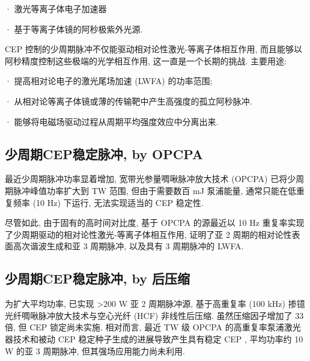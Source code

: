 \documentclass[14pt,a4paper,oneside]{article}
\numberwithin{equation}{subsection}             %
\numberwithin{figure}{subsection}               %
\begin{document}
· 激光等离子体电子加速器\cite{malkaLaserPlasmaAccelerators2012}

· 基于等离子体镜的阿秒极紫外光源\cite{thauryHighorderHarmonicAttosecond2010}. 

CEP 控制的少周期脉冲不仅能驱动相对论性激光-等离子体相互作用, 而且能够以阿秒精度控制这些极端的光学相互作用, 这一直是一个长期的挑战. 主要用途:

· 提高相对论电子的激光尾场加速 (LWFA) 的功率范围\cite{guenotRelativisticElectronBeams2017};

· 从相对论等离子体镜\cite{jahnIntenseIsolatedAttosecond2019}或薄的传输靶\cite{zhangIntenseAttosecondPulses2017}中产生高强度的孤立阿秒脉冲. 

· 能够将电磁场驱动过程从周期平均强度效应中分离出来. 

\subsection{少周期CEP稳定脉冲, by OPCPA}

最近少周期脉冲功率显着增加, 宽带光参量啁啾脉冲放大技术 (OPCPA) 已将少周期脉冲峰值功率扩大到 TW 范围\cite{grusonTWTwocycleIR2017, rivasNextGenerationDriver2017, kesselRelativisticFewcyclePulses2018}, 但由于需要数百 mJ 泵浦能量, 通常只能在低重复频率 (10 Hz) 下运行, 无法实现适当的 CEP 稳定性. 

尽管如此, 由于固有的高时间对比度, 基于 OPCPA 的源最近以 10 Hz 重复率实现了少周期驱动的相对论性激光-等离子体相互作用, 证明了亚 2 周期的相对论性表面高次谐波生成\cite{rivasNextGenerationDriver2017}和亚 3 周期脉冲\cite{jahnIntenseIsolatedAttosecond2019, kesselRelativisticFewcyclePulses2018, korminSpectralInterferometryWaveformdependent2018}, 以及具有 3 周期脉冲\cite{schmidFewcycleLaserdrivenElectron2009}的 LWFA. 

\subsection{少周期CEP稳定脉冲, by 后压缩}

为扩大平均功率, 已实现 >200 W 亚 2 周期脉冲源\cite{hadrichEnergeticSub2cycleLaser2016}, 基于高重复率 (100 kHz) 掺镱光纤啁啾脉冲放大技术与空心光纤 (HCF) 非线性后压缩\cite{nisoliGenerationHighEnergy1996}. 虽然压缩因子增加了 33 倍\cite{jeongDirectCompression170fs2018}, 但 CEP 锁定尚未实施. 相对而言, 最近 TW 级 OPCPA 的高重复率泵浦激光器技术和被动 CEP 稳定种子生成\cite{baltuskaControllingCarrierenvelopePhase2002}的进展导致产生具有稳定 CEP , 平均功率约 10 W 的亚 3 周期脉冲\cite{budriunas53AveragePower2017}, 但其强场应用能力尚未利用. 
\end{document}

